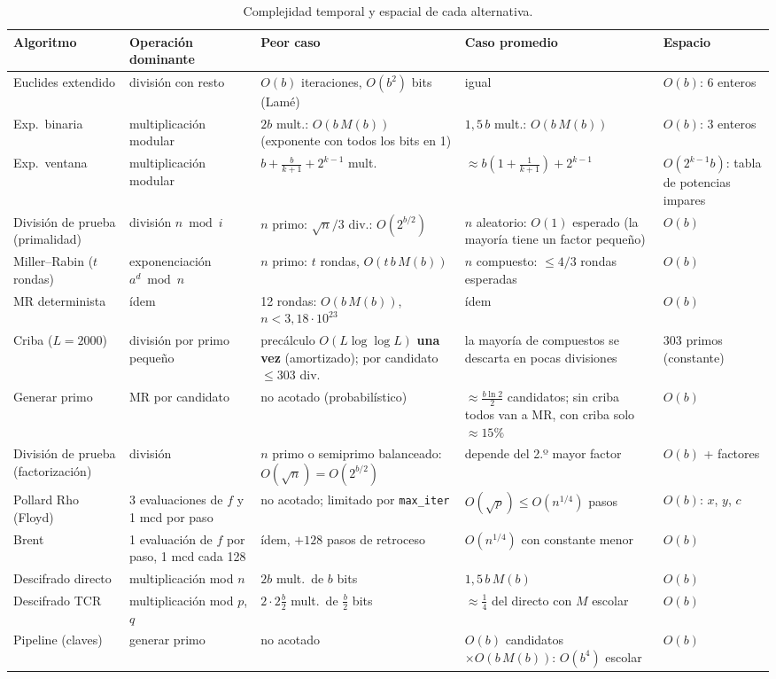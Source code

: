 \begin{table}[H]
\centering
\caption{Complejidad temporal y espacial de cada alternativa.}
\label{tab:complejidad}
\scriptsize
\renewcommand{\arraystretch}{1.3}
\begin{tabularx}{\linewidth}{@{}R{2.2cm} R{2.1cm} R{2.6cm} R{2.6cm} Y@{}}
\toprule
\textbf{Algoritmo} & \textbf{Operación dominante} & \textbf{Peor caso} & \textbf{Caso promedio} & \textbf{Espacio}\\
\midrule
Euclides extendido & división con resto & $O(b)$ iteraciones, $O(b^2)$ bits (Lamé) & igual & $O(b)$: 6 enteros\\
Exp.\ binaria & multiplicación modular & $2b$ mult.: $O(b\,M(b))$ (exponente con todos los bits en 1) & $1{,}5\,b$ mult.: $O(b\,M(b))$ & $O(b)$: 3 enteros\\
Exp.\ ventana & multiplicación modular & $b+\frac{b}{k+1}+2^{k-1}$ mult. & $\approx b(1+\frac{1}{k+1})+2^{k-1}$ & $O(2^{k-1}b)$: tabla de potencias impares\\
División de prueba (primalidad) & división $n \bmod i$ & $n$ primo: $\sqrt n/3$ div.: $O(2^{b/2})$ & $n$ aleatorio: $O(1)$ esperado (la mayoría tiene un factor pequeño) & $O(b)$\\
Miller--Rabin ($t$ rondas) & exponenciación $a^d\bmod n$ & $n$ primo: $t$ rondas, $O(t\,b\,M(b))$ & $n$ compuesto: $\le4/3$ rondas esperadas & $O(b)$\\
MR determinista & ídem & 12 rondas: $O(b\,M(b))$, $n<3{,}18\cdot10^{23}$ & ídem & $O(b)$\\
Criba ($L=2000$) & división por primo pequeño & precálculo $O(L\log\log L)$ \textbf{una vez} (amortizado); por candidato $\le303$ div. & la mayoría de compuestos se descarta en pocas divisiones & 303 primos (constante)\\
Generar primo & MR por candidato & no acotado (probabilístico) & $\approx\frac{b\ln2}{2}$ candidatos; sin criba todos van a MR, con criba solo $\approx15\%$ & $O(b)$\\
División de prueba (factorización) & división & $n$ primo o semiprimo balanceado: $O(\sqrt n)=O(2^{b/2})$ & depende del 2.º mayor factor & $O(b)$ + factores\\
Pollard Rho (Floyd) & 3 evaluaciones de $f$ y 1 mcd por paso & no acotado; limitado por \texttt{max\_iter} & $O(\sqrt p)\le O(n^{1/4})$ pasos & $O(b)$: $x$, $y$, $c$\\
Brent & 1 evaluación de $f$ por paso, 1 mcd cada 128 & ídem, $+128$ pasos de retroceso & $O(n^{1/4})$ con constante menor & $O(b)$\\
Descifrado directo & multiplicación mod $n$ & $2b$ mult.\ de $b$ bits & $1{,}5\,b\,M(b)$ & $O(b)$\\
Descifrado TCR & multiplicación mod $p$, $q$ & $2\cdot2\frac{b}{2}$ mult.\ de $\frac{b}{2}$ bits & $\approx\frac{1}{4}$ del directo con $M$ escolar & $O(b)$\\
Pipeline (claves) & generar primo & no acotado & $O(b)$ candidatos $\times O(b\,M(b))$: $O(b^4)$ escolar & $O(b)$\\
\bottomrule
\end{tabularx}
\end{table}

